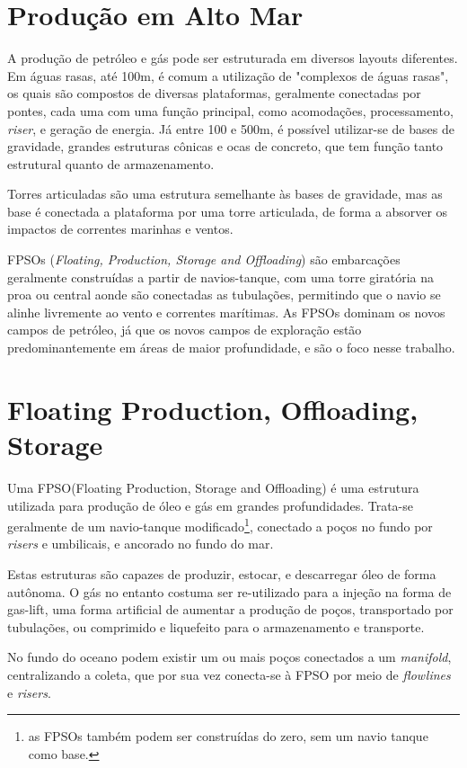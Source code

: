 \section{Produção em Alto Mar}

A produção de petróleo e gás pode ser estruturada em diversos layouts diferentes.
% 
Em águas rasas, até 100m, é comum a utilização de "complexos de águas rasas", os quais são compostos de diversas plataformas, geralmente conectadas por pontes, cada uma com uma função principal, como acomodações, processamento, \textit{riser}, e geração de energia.
%
Já entre 100 e 500m, é possível utilizar-se de bases de gravidade, grandes estruturas cônicas e ocas de concreto, que tem função tanto estrutural quanto de armazenamento. 
%

Torres articuladas são uma estrutura semelhante às bases de gravidade, mas as base é conectada a plataforma por uma torre articulada, de forma a absorver os impactos de correntes marinhas e ventos.
%

FPSOs (\textit{Floating, Production, Storage and Offloading}) são embarcações geralmente construídas a partir de navios-tanque, com uma torre giratória na proa ou central aonde são conectadas as tubulações, permitindo que o navio se alinhe livremente ao vento e correntes marítimas. 
%
As FPSOs dominam os novos campos de petróleo, já que os novos campos de exploração estão predominantemente em áreas de maior profundidade, e são o foco nesse trabalho.

\section{Floating Production, Offloading, Storage}
Uma FPSO(Floating Production, Storage and Offloading) é uma estrutura utilizada para produção de óleo e gás em grandes profundidades. Trata-se geralmente de um navio-tanque modificado\footnote{as FPSOs também podem ser construídas do zero, sem um navio tanque como base.}, conectado a poços no fundo por \textit{risers} e umbilicais, e ancorado no fundo do mar.

Estas estruturas são capazes de produzir, estocar, e descarregar óleo de forma autônoma. O gás no entanto costuma ser re-utilizado para a injeção na forma de gas-lift, uma forma artificial de aumentar a produção de poços, transportado por tubulações, ou comprimido e liquefeito para o armazenamento e transporte.

No fundo do oceano podem existir um ou mais poços conectados a um \textit{manifold}, centralizando a coleta, que por sua vez conecta-se à FPSO por meio de \textit{flowlines} e \textit{risers}.


